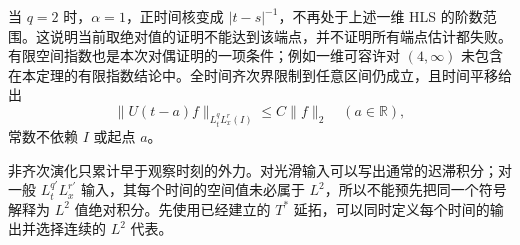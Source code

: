 \ProseParagraphBreak

当 \(q=2\) 时，\(\alpha=1\)，正时间核变成 \(|t-s|^{-1}\)，不再处于上述一维 HLS 的阶数范围。这说明当前取绝对值的证明不能达到该端点，并不证明所有端点估计都失败。有限空间指数也是本次对偶证明的一项条件；例如一维可容许对 \((4,\infty)\) 未包含在本定理的有限指数结论中。全时间齐次界限制到任意区间仍成立，且时间平移给出
\[
 \|U(t-a)f\|_{L^q_tL^r_x(I)}\leq C\|f\|_2
 \quad(a\in\mathbb R),
\]
常数不依赖 \(I\) 或起点 \(a\)。

\ProseParagraphBreak

非齐次演化只累计早于观察时刻的外力。对光滑输入可以写出通常的迟滞积分；对一般 \(L^{q'}_tL^{r'}_x\) 输入，其每个时间的空间值未必属于 \(L^2\)，所以不能预先把同一个符号解释为 \(L^2\) 值绝对积分。先使用已经建立的 \(T^*\) 延拓，可以同时定义每个时间的输出并选择连续的 \(L^2\) 代表。

